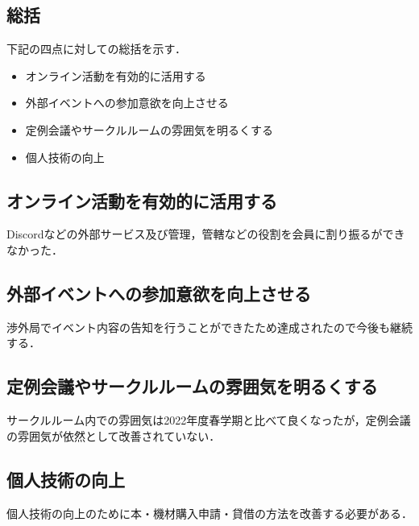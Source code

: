 \subsection*{\secondGrade{}総括}


下記の四点に対しての総括を示す．
\begin{itemize}
    \item オンライン活動を有効的に活用する
    \item 外部イベントへの参加意欲を向上させる
    \item 定例会議やサークルルームの雰囲気を明るくする
    \item 個人技術の向上
\end{itemize}

\subsection*{オンライン活動を有効的に活用する}
Discordなどの外部サービス及び管理，管轄などの役割を会員に割り振るができなかった．

\subsection*{外部イベントへの参加意欲を向上させる}
渉外局でイベント内容の告知を行うことができたため達成されたので今後も継続する．

\subsection*{定例会議やサークルルームの雰囲気を明るくする}
サークルルーム内での雰囲気は2022年度春学期と比べて良くなったが，定例会議の雰囲気が依然として改善されていない．

\subsection*{個人技術の向上}
個人技術の向上のために本・機材購入申請・貸借の方法を改善する必要がある．
